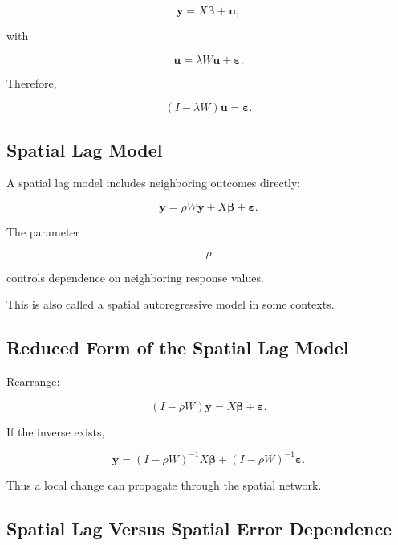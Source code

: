 \[
\boxed{
\mathbf{y}
=
X\boldsymbol{\beta}
+
\mathbf{u},
}
\]

with

\[
\boxed{
\mathbf{u}
=
\lambda
W\mathbf{u}
+
\boldsymbol{\varepsilon}.
}
\]

Therefore,

\[
\boxed{
(
I-\lambda W
)
\mathbf{u}
=
\boldsymbol{\varepsilon}.
}
\]

\subsection{Spatial Lag Model}
\label{subsec:spatial-lag-model}

A spatial lag model includes neighboring outcomes directly:

\[
\boxed{
\mathbf{y}
=
\rho
W\mathbf{y}
+
X\boldsymbol{\beta}
+
\boldsymbol{\varepsilon}.
}
\]

The parameter

\[
\rho
\]

controls dependence on neighboring response values.

This is also called a spatial autoregressive model in some contexts.

\subsection{Reduced Form of the Spatial Lag Model}
\label{subsec:spatial-lag-reduced-form}

Rearrange:

\[
(
I-\rho W
)
\mathbf{y}
=
X\boldsymbol{\beta}
+
\boldsymbol{\varepsilon}.
\]

If the inverse exists,

\[
\boxed{
\mathbf{y}
=
(
I-\rho W
)^{-1}
X\boldsymbol{\beta}
+
(
I-\rho W
)^{-1}
\boldsymbol{\varepsilon}.
}
\]

Thus a local change can propagate through the spatial network.

\subsection{Spatial Lag Versus Spatial Error Dependence}
\label{subsec:spatial-lag-versus-error}

